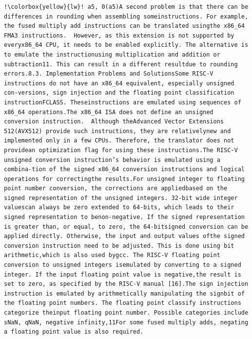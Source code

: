 \begin{frame}[fragile]
\begin{columns}[c]
\begin{lstlisting}[language=rv64, escapechar=!]
    !\colorbox{yellow}{lw}! a5, 0(a5)A second problem is that there can be differences in rounding when assembling someinstructions. For example, the fused multiply add instructions can be translated usingthe x86_64 FMA3 instructions.  However, as this extension is not supported by everyx86_64 CPU, it needs to be enabled explicitly. The alternative is to emulate the instructionusing multiplication and addition or subtraction11. This can result in a different resultdue to rounding errors.8.3. Implementation Problems and SolutionsSome RISC-V instructions do not have an x86_64 equivalent, especially unsigned con-versions, sign injection and the floating point classification instructionFCLASS. Theseinstructions are emulated using sequences of x86_64 operations.The x86_64 ISA does not define an unsigned conversion instruction.  Although theAdvanced Vector Extensions 512(AVX512) provide such instructions, they are relativelynew and implemented only in a few CPUs. Therefore, the translator does not providean optimization flag for using these instructions.The RISC-V unsigned conversion instruction’s behavior is emulated using a combina-tion of the signed x86_64 conversion instructions and logical operations for correctingthe results.For unsigned integer to floating point number conversion, the corrections are appliedbased on the signed representation of the unsigned integers. 32-bit wide integer valuescan always be zero extended to 64-bits, which leads to their signed representation to benon-negative. If the signed representation is greater than, or equal, to zero, the 64-bitsigned conversion can be applied directly. Otherwise, the input and output values ofthe signed conversion instruction need to be adjusted. This is done using bit arithmetic,which is also used bygcc. The RISC-V floating point conversion to unsigned integers isemulated by converting to a signed integer. If the input floating point value is negative,the result is set to zero, as specified by the RISC-V manual [16].The sign injection instruction is emulated by arithmetically manipulating the signbit of the floating point numbers. The floating point classify instructions categorize theinput floating point number. Possible categories include sNaN, qNaN, negative infinity,11For some fused multiply adds, negating a floating point value is also required.

\end{lstlisting}
\end{columns}
\end{frame}
